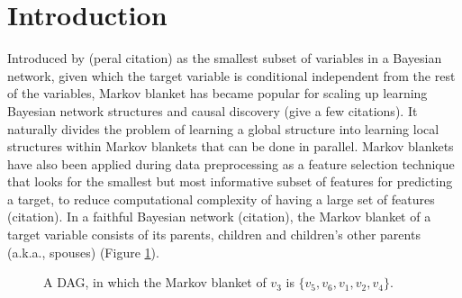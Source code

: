 \section{Introduction}
Introduced by (peral citation) as the smallest subset of variables in a Bayesian network, given which the target variable is conditional independent from the rest of the variables, Markov blanket has became popular for scaling up learning Bayesian network structures and causal discovery (give a few citations). It naturally divides the problem of learning a global structure into learning local structures within Markov blankets that can be done in parallel. Markov blankets have also been applied during data preprocessing as a feature selection technique that looks for the smallest but most informative subset of features for predicting a target, to reduce computational complexity of having a large set of features (citation). In a faithful Bayesian network (citation), the Markov blanket of a target variable consists of its parents, children and children's other parents (a.k.a., spouses) (Figure \ref{fg:mb_example}).  
\begin{figure}[H]
\centering
{}
\caption{A DAG, in which the Markov blanket of $v_3$ is $\{v_5,v_6,v_1,v_2,v_4\}$.}
\label{fg:mb_example}
\end{figure}
